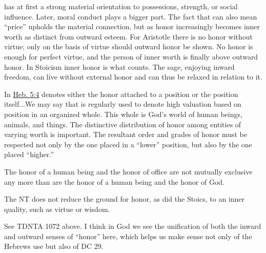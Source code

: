 \begin{compactdesc}
					\item[TDNTA] \phantom{.}
						\begin{compactdesc}
							\item[1072]  has at first a strong material orientation to possessions, strength, or social influence. Later, moral conduct plays a bigger part. The fact that  can also mean ``price'' upholds the material connection, but  as honor increasingly becomes inner worth as distinct from outward esteem. For Aristotle there is no honor without virtue; only on the basis of virtue should outward honor be shown. No honor is enough for perfect virtue, and the person of inner worth is finally above outward honor. In Stoicism inner honor is what counts. The sage, enjoying inward freedom, can live without external honor and can thus be relaxed in relation to it.
						\end{compactdesc}
						
					\item[NIDNTTE] \phantom{.}
						\begin{compactdesc}
							\item[4:496] In \hyperref[HEBREWS-5-4]{Heb. 5:4}  denotes either the honor attached to a position or the position itself...We may say that  is regularly used to denote high valuation based on position in an organized whole. This whole is God's world of human beings, animals, and things. The distinctive distribution of honor among entities of varying worth is important. The resultant order and grades of honor must be respected not only by the one placed in a ``lower'' position, but also by the one placed ``higher.''
							\item[4:497] The honor of a human being and the honor of office are not mutually exclusive any more than are the honor of a human being and the honor of God.
							\item[4:497] The NT does not reduce the ground for honor, as did the Stoics, to an inner quality, such as virtue or wisdom.
								\begin{compactitem}
									\item See TDNTA 1072 above. I think in God we see the unification of both the inward and outward senses of ``honor'' here, which helps us make sense not only of the Hebrews use but also of DC 29.
								\end{compactitem}
						\end{compactdesc}
						
						
				\end{compactdesc}
				
